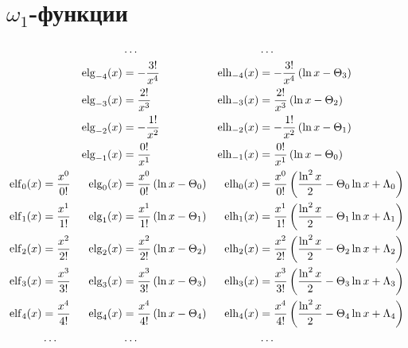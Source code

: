 
\section{$\omega_1$-функции}

\begin{equation*} \begin{aligned}
&&
&\ldots &
&\ldots \\
%
&&
\elg_{-4}(x) &=
- \frac{3!}{x^4} &
\elh_{-4}(x) &=
- \frac{3!}{x^4} \left(
  \ln{x} - \Theta_3 \right) \\
%
&&
\elg_{-3}(x) &=
  \frac{2!}{x^3} &
\elh_{-3}(x) &=
  \frac{2!}{x^3} \left(
  \ln{x} - \Theta_2 \right) \\
%
&& 
\elg_{-2}(x) &=
- \frac{1!}{x^2} &
\elh_{-2}(x) &=
- \frac{1!}{x^2} \left(
  \ln{x} - \Theta_1 \right) \\
%
&& 
\elg_{-1}(x) &=
  \frac{0!}{x^1} &
\elh_{-1}(x) &=
  \frac{0!}{x^1} \left(
  \ln{x} - \Theta_0 \right) \\
%
\elf_0(x) &=
  \frac{x^0}{0!} &
\elg_0(x) &= 
  \frac{x^0}{0!} \left(
  \ln{x} - \Theta_0 \right) &
\elh_0(x) &=
  \frac{x^0}{0!} \left(
  \frac{\ln^2{x}}{2}
- \Theta_0 \ln{x}
+ \Lambda_0 \right) \\
%
\elf_1(x) &=
  \frac{x^1}{1!} &
\elg_1(x) &= 
  \frac{x^1}{1!} \left(
  \ln{x} - \Theta_1 \right) &
\elh_1(x) &=
  \frac{x^1}{1!} \left(
  \frac{\ln^2{x}}{2}
- \Theta_1 \ln{x}
+ \Lambda_1 \right) \\
%
\elf_2(x) &=
  \frac{x^2}{2!} &
\elg_2(x) &= 
  \frac{x^2}{2!} \left(
  \ln{x} - \Theta_2 \right) &
\elh_2(x) &=
  \frac{x^2}{2!} \left(
  \frac{\ln^2{x}}{2}
- \Theta_2 \ln{x}
+ \Lambda_2 \right) \\
%
\elf_3(x) &=
  \frac{x^3}{3!} &
\elg_3(x) &= 
  \frac{x^3}{3!} \left(
  \ln{x} - \Theta_3 \right) &
\elh_3(x) &=
  \frac{x^3}{3!} \left(
  \frac{\ln^2{x}}{2}
- \Theta_3 \ln{x}
+ \Lambda_3 \right) \\
%
\elf_4(x) &=
  \frac{x^4}{4!} &
\elg_4(x) &= 
  \frac{x^4}{4!} \left(
  \ln{x} - \Theta_4 \right) &
\elh_4(x) &=
  \frac{x^4}{4!} \left(
  \frac{\ln^2{x}}{2}
- \Theta_4 \ln{x}
+ \Lambda_4 \right) \\
%
&\ldots &
&\ldots &
&\ldots \\
\end{aligned} \end{equation*}
